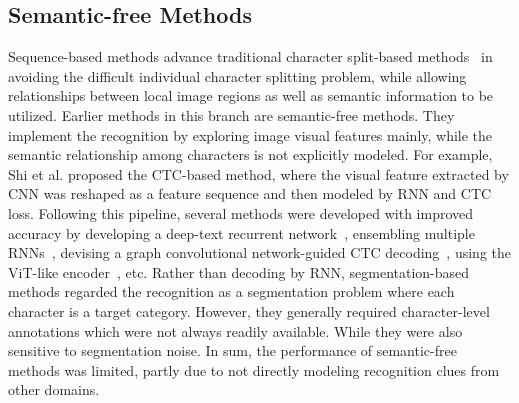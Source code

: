 \subsection{Semantic-free Methods}
Sequence-based methods advance traditional character split-based methods~\citep{bai2014chinese,jaderberg2016reading} in avoiding the difficult individual character splitting problem, while allowing relationships between local image regions as well as semantic information to be utilized. Earlier methods in this branch are semantic-free methods. They implement the recognition by exploring image visual features mainly, while the semantic relationship among characters is not explicitly modeled. For example, Shi et al. \citep{ShiBY17crnn} proposed the CTC-based method, where the visual feature extracted by CNN was reshaped as a feature sequence and then modeled by RNN and CTC loss. Following this pipeline, several methods were developed with improved accuracy by developing a deep-text recurrent network~\citep{he2016reading}, ensembling multiple RNNs~\citep{su2017accurate}, devising a graph convolutional network-guided CTC decoding~\citep{hu2020gtc}, using the ViT-like encoder~\citep{Du2022SVTR}, etc. Rather than decoding by RNN, segmentation-based methods \citep{liao2019two_dim_per,xing2019convolutional,li2017fcsem}regarded the recognition as a segmentation problem where each character is a target category.  However, they generally required character-level annotations which were not always readily available. While they were also sensitive to segmentation noise. In sum, the performance of semantic-free methods was limited, partly due to not directly modeling recognition clues from other domains.

